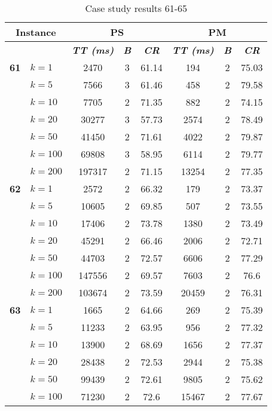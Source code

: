     \begin{table}[htbp]
    \caption{Case study results 61-65}
    \centering
    \begin{tabular}{|l|l|c|c|c|c|c|c|}
    \hline
    \multicolumn{ 2}{|c|}{\textbf{Instance}} & \multicolumn{ 3}{c|}{\textbf{PS}} & \multicolumn{ 3}{c|}{\textbf{PM}} \\ \hline
    \multicolumn{ 2}{|l|}{} & \textbf{\textit{TT (ms)}} & \textbf{\textit{B}} & \textbf{\textit{CR}} & \textbf{\textit{TT (ms)}} & \textbf{\textit{B}} & \textbf{\textit{CR}} \\ \hline
    \multicolumn{1}{|r|}{\textbf{61}} & $k=1$ & 2470 & 3 & 61.14 & 194 & 2 & 75.03 \\ 
     & $k=5$ & 7566 & 3 & 61.46 & 458 & 2 & 79.58 \\ 
     & $k=10$ & 7705 & 2 & 71.35 & 882 & 2 & 74.15 \\ 
     & $k=20$ & 30277 & 3 & 57.73 & 2574 & 2 & 78.49 \\ 
     & $k=50$ & 41450 & 2 & 71.61 & 4022 & 2 & 79.87 \\ 
     & $k=100$ & 69808 & 3 & 58.95 & 6114 & 2 & 79.77 \\ 
     & $k=200$ & 197317 & 2 & 71.15 & 13254 & 2 & 77.35 \\ \hline
    \multicolumn{1}{|r|}{\textbf{62}} & $k=1$ & 2572 & 2 & 66.32 & 179 & 2 & 73.37 \\ 
     & $k=5$ & 10605 & 2 & 69.85 & 507 & 2 & 73.55 \\ 
     & $k=10$ & 17406 & 2 & 73.78 & 1380 & 2 & 73.49 \\ 
     & $k=20$ & 45291 & 2 & 66.46 & 2006 & 2 & 72.71 \\ 
     & $k=50$ & 44703 & 2 & 72.57 & 6606 & 2 & 77.29 \\ 
     & $k=100$ & 147556 & 2 & 69.57 & 7603 & 2 & 76.6 \\ 
     & $k=200$ & 103674 & 2 & 73.59 & 20459 & 2 & 76.31 \\ \hline
    \multicolumn{1}{|r|}{\textbf{63}} & $k=1$ & 1665 & 2 & 64.66 & 269 & 2 & 75.39 \\ 
     & $k=5$ & 11233 & 2 & 63.95 & 956 & 2 & 77.32 \\ 
     & $k=10$ & 13900 & 2 & 68.69 & 1656 & 2 & 77.37 \\ 
     & $k=20$ & 28438 & 2 & 72.53 & 2944 & 2 & 75.38 \\ 
     & $k=50$ & 99439 & 2 & 72.61 & 9805 & 2 & 75.62 \\ 
     & $k=100$ & 71230 & 2 & 72.6 & 15467 & 2 & 77.67 \\ 

\end{tabular}
\end{table}
